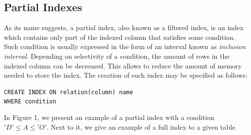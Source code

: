 \documentclass[10pt, conference, compsocconf]{IEEEtran}
\begin{document}
\subsection{Partial Indexes}
\label{subsec:partial}
As its name suggests, a partial index, also known as a filtered index, is an index which contains only part of the indexed column that satisfies some condition. Such condition is usually expressed in the form of an interval known as \emph{inclusion interval}. Depending on selectivity of a condition, the amount of rows in the indexed column can be decreased. This allows to reduce the amount of memory needed to store the index. The creation of such index may be specified as follows:
\begin{displayquote}
\texttt{CREATE \hspace{0.2 cm} INDEX \hspace{0.2 cm} ON \hspace{0.2 cm} relation(column) name \\ WHERE \hspace{0.2 cm} condition}
\end{displayquote}

In Figure 1, we present an example of a partial index with a condition $'D' \leq A \leq 'O'$. Next to it, we give an example of a full index to a given table.
\end{document}
